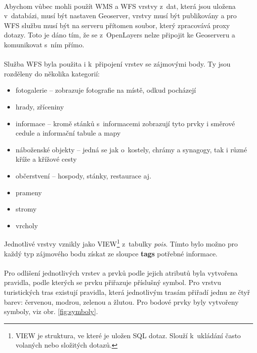 \documentclass[11pt,a4paper,titlepage,oneside]{book}
\begin{document}
			\paragraph{} Abychom vůbec mohli použít \ac{WMS} a \ac{WFS} vrstvy z~dat, která jsou uložena v~databázi, musí být nastaven Geoserver, vrstvy musí být publikovány a pro \ac{WFS} službu musí být na serveru přítomen soubor, který zpracovává proxy dotazy. Toto je dáno tím, že se z~OpenLayers nelze připojit ke Geoserveru a komunikovat s~ním přímo. 

			\paragraph{} Služba \ac{WFS} byla použita i k~připojení vrstev se zájmovými body. Ty jsou rozděleny do několika kategorií:
					\begin{itemize}
						\item fotogalerie -- zobrazuje fotografie na místě, odkud pocházejí
						\item hrady, zříceniny
						\item informace -- kromě stánků s~informacemi zobrazují tyto prvky i směrové cedule a informační tabule a mapy
						\item náboženské objekty -- jedná se jak o~kostely, chrámy a synagogy, tak i různé kříže a křížové cesty
						\item občerstvení -- hospody, stánky, restaurace aj.
						\item prameny
						\item stromy
						\item vrcholy
					\end{itemize}	
Jednotlivé vrstvy vznikly jako VIEW\footnote{VIEW je struktura, ve které je uložen SQL dotaz. Slouží k~ukládání často volaných nebo složitých dotazů.} z~tabulky \textit{pois}. Tímto bylo možno pro každý typ zájmového bodu získat ze sloupce \textbf{tags} potřebné informace.

			\paragraph{} Pro odlišení jednotlivých vrstev a prvků podle jejich atributů byla vytvořena pravidla, podle kterých se prvku přiřazuje příslušný symbol. Pro vrstvu turistických tras existují pravidla, která jednotlivým trasám přiřadí jednu ze čtyř barev: červenou, modrou, zelenou a žlutou. Pro bodové prvky byly vytvořeny symboly, viz obr. \ref{fig:symboly}.
			
\end{document}
